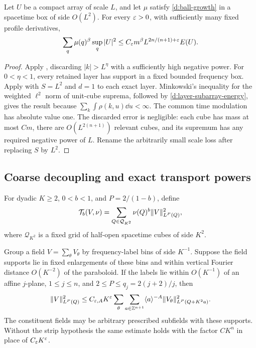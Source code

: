 \begin{corollary}
\label{d:power-loss}
Let $U$ be a compact array of scale $L$, and let $\mu$ satisfy
\eqref{d:ball-growth} in a spacetime box of side $O(L^2)$.
For every $\varepsilon>0$, with sufficiently many fixed profile derivatives,
\begin{equation}
 \sum_q\mu(q)^\beta\sup_q|U|^2
       \le C_\varepsilon m^\beta L^{2n/(n+1)+\varepsilon}E(U).
 \label{d:compact-fractal}
\end{equation}
\end{corollary}

\begin{proof}
Apply , discarding $|k|>L^\eta$ with a sufficiently high
negative power.  For $0<\eta<1$, every retained layer has support in a
fixed bounded frequency box.  Apply  with $S=L^2$ and
$d=1$ to each exact layer.  Minkowski's inequality for the weighted
$\ell^2$ norm of unit-cube suprema, followed by
\eqref{d:layer-subarray-energy}, gives the result because
$\sum_k\int\rho(k,u)\dd u<\infty$.  The common time modulation has
absolute value one.  The discarded error is negligible: each cube
has mass at most $Cm$, there are $O(L^{2(n+1)})$ relevant cubes, and
its supremum has any required negative power of $L$.  Rename the
arbitrarily small scale loss after replacing $S$ by $L^2$.
\end{proof}

\subsection{Coarse decoupling and exact transport powers}

For dyadic $K\ge2$, $0<b<1$, and $P=2/(1-b)$, define
\begin{equation}
 \mathcal T_b(V,\nu)
       =\sum_{Q\in\mathcal Q_{K^2}}
              \nu(Q)^b\lVert V\rVert_{L^P(Q)}^2,
 \label{d:coarse-functional}
\end{equation}
where $\mathcal Q_{K^2}$ is a fixed grid of half-open spacetime cubes
of side $K^2$.

\begin{lemma}
\label{d:strip-decoupling}
Group a field $V=\sum_\theta V_\theta$ by frequency-label bins of side
$K^{-1}$.  Suppose the field supports lie in fixed enlargements of
these bins and within vertical Fourier distance $O(K^{-2})$ of the
paraboloid.  If the labels lie within $O(K^{-1})$ of an affine
$j$-plane, $1\le j\le n$, and $2\le P\le q_j=2(j+2)/j$, then
\begin{equation}
 \lVert V\rVert_{L^P(Q)}^2
 \le C_{\varepsilon,A}K^\varepsilon
       \sum_\theta\sum_{a\in\mathbb Z^{n+1}}\langle a\rangle^{-A}
                 \lVert V_\theta\rVert_{L^P(Q+K^2a)}^2.
 \label{d:local-strip-decoupling}
\end{equation}
The constituent fields may be arbitrary prescribed subfields with
these supports.  Without the strip hypothesis the same estimate holds
with the factor $CK^n$ in place of $C_\varepsilon K^\varepsilon$.
\end{lemma}

